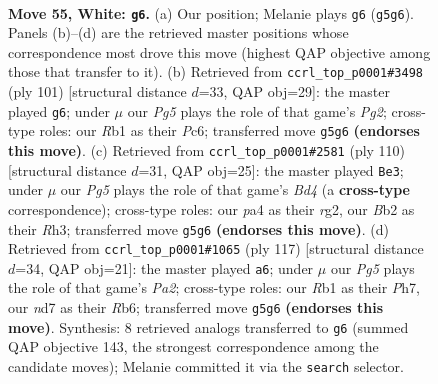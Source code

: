 \documentclass[11pt]{article}
\begin{document}
\clearpage

\begin{figure}[p]\centering
\begin{subfigure}{0.46\textwidth}\centering
\resizebox{\linewidth}{!}{%
\newchessgame
\chessboard[
  setfen={6k1/3n4/8/4r1P1/p1p3K1/P1P4p/1BP4P/1R6 w - - 3 55},
  showmover=false,
  pgfstyle=straightmove, color=movearrow, markmove={g5-g6}
]}
\caption{}
\end{subfigure}\hfill
\begin{subfigure}{0.46\textwidth}\centering
\resizebox{\linewidth}{!}{%
\newchessgame
\chessboard[
  setfen={6R1/5pp1/2p4p/3b1k1P/5P2/8/5P2/2K5 b - - 2 51},
  showmover=false,
  pgfstyle=straightmove, color=movearrow, markmove={g7-g6}
]}
\caption{}
\end{subfigure}
\\[4pt]
\begin{subfigure}{0.46\textwidth}\centering
\resizebox{\linewidth}{!}{%
\newchessgame
\chessboard[
  setfen={4k3/2p5/2n1pK2/2P1P3/3BP2P/7R/6r1/8 w - - 17 56},
  showmover=false,
  pgfstyle=straightmove, color=movearrow, markmove={d4-e3}
]}
\caption{}
\end{subfigure}\hfill
\begin{subfigure}{0.46\textwidth}\centering
\resizebox{\linewidth}{!}{%
\newchessgame
\chessboard[
  setfen={8/p3Pk1p/1r6/1bp4p/2p2P2/2P2NK1/R7/8 b - - 2 59},
  showmover=false,
  pgfstyle=straightmove, color=movearrow, markmove={a7-a6}
]}
\caption{}
\end{subfigure}
\caption{\textbf{Move 55, White: \texttt{g6}.} (a) Our position; Melanie plays \texttt{g6} (\texttt{g5g6}). Panels (b)--(d) are the retrieved master positions whose correspondence most drove this move (highest QAP objective among those that transfer to it). (b) Retrieved from \texttt{ccrl\_top\_p0001\#3498} (ply 101) [structural distance $d$=33, QAP obj=29]: the master played \texttt{g6}; under $\mu$ our \emph{Pg5} plays the role of that game's \emph{Pg2}; cross-type roles: our \emph{R}b1 as their \emph{P}c6; transferred move \texttt{g5g6} \textbf{(endorses this move)}. (c) Retrieved from \texttt{ccrl\_top\_p0001\#2581} (ply 110) [structural distance $d$=31, QAP obj=25]: the master played \texttt{Be3}; under $\mu$ our \emph{Pg5} plays the role of that game's \emph{Bd4} (a \textbf{cross-type} correspondence); cross-type roles: our \emph{p}a4 as their \emph{r}g2, our \emph{B}b2 as their \emph{R}h3; transferred move \texttt{g5g6} \textbf{(endorses this move)}. (d) Retrieved from \texttt{ccrl\_top\_p0001\#1065} (ply 117) [structural distance $d$=34, QAP obj=21]: the master played \texttt{a6}; under $\mu$ our \emph{Pg5} plays the role of that game's \emph{Pa2}; cross-type roles: our \emph{R}b1 as their \emph{P}h7, our \emph{n}d7 as their \emph{R}b6; transferred move \texttt{g5g6} \textbf{(endorses this move)}. Synthesis: 8 retrieved analogs transferred to \texttt{g6} (summed QAP objective 143, the strongest correspondence among the candidate moves); Melanie committed it via the \texttt{search} selector.}
\label{fig:thought-m108}
\end{figure}
\end{document}
